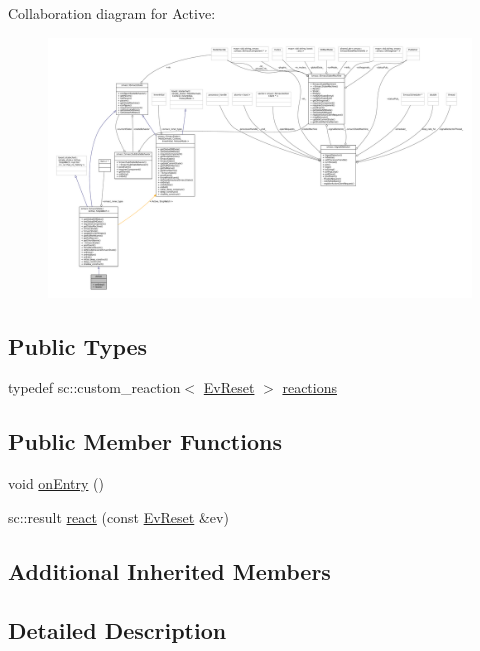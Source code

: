 Collaboration diagram for Active\+:
\nopagebreak
\begin{figure}[H]
\begin{center}
\leavevmode
\includegraphics[width=350pt]{structActive__coll__graph}
\end{center}
\end{figure}
\subsection*{Public Types}
\begin{DoxyCompactItemize}
\item 
typedef sc\+::custom\+\_\+reaction$<$ \hyperlink{structEvReset}{Ev\+Reset} $>$ \hyperlink{structActive_a2df2dabcf29191d36281a0fc2a29fd87}{reactions}
\end{DoxyCompactItemize}
\subsection*{Public Member Functions}
\begin{DoxyCompactItemize}
\item 
void \hyperlink{structActive_ab6be732073ce73ec70afdff59cef7188}{on\+Entry} ()
\item 
sc\+::result \hyperlink{structActive_a9ca01e927be26d724f1f2db3a37d30b4}{react} (const \hyperlink{structEvReset}{Ev\+Reset} \&ev)
\end{DoxyCompactItemize}
\subsection*{Additional Inherited Members}


\subsection{Detailed Description}


